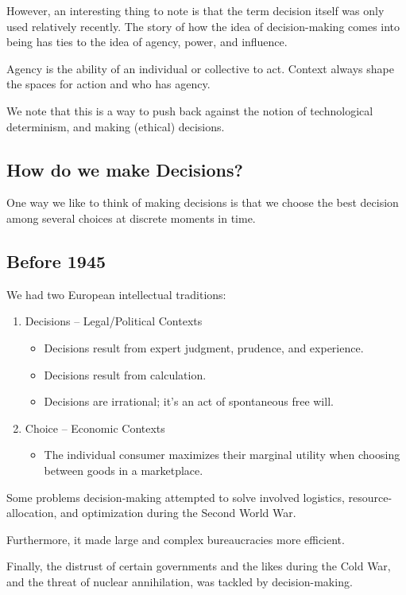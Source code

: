 \documentclass[openany]{book}
\begin{document}
However, an interesting thing to note is that the term decision itself was only used relatively recently. The story of how the idea of decision-making comes into being has ties to the idea of agency, power, and influence.

\begin{defn}[Agency]
	Agency is the ability of an individual or collective to act. Context always shape the spaces for action and who has agency.
\end{defn}

We note that this is a way to push back against the notion of technological determinism, and making (ethical) decisions.

\subsection{How do we make Decisions?}
One way we like to think of making decisions is that we choose the best decision among several choices at discrete moments in time.

\subsection{Before 1945}
We had two European intellectual traditions:
\begin{enumerate}
	\item Decisions -- Legal/Political Contexts
	\begin{itemize}
		\item Decisions result from expert judgment, prudence, and experience.
		\item Decisions result from calculation.
		\item Decisions are irrational; it's an act of spontaneous free will.
	\end{itemize}
	\item Choice -- Economic Contexts
	\begin{itemize}
		\item The individual consumer maximizes their marginal utility when choosing between goods in a marketplace.
	\end{itemize}
\end{enumerate}

Some problems decision-making attempted to solve involved logistics, resource-allocation, and optimization during the Second World War.

Furthermore, it made large and complex bureaucracies more efficient.

Finally, the distrust of certain governments and the likes during the Cold War, and the threat of nuclear annihilation, was tackled by decision-making.
\end{document}
